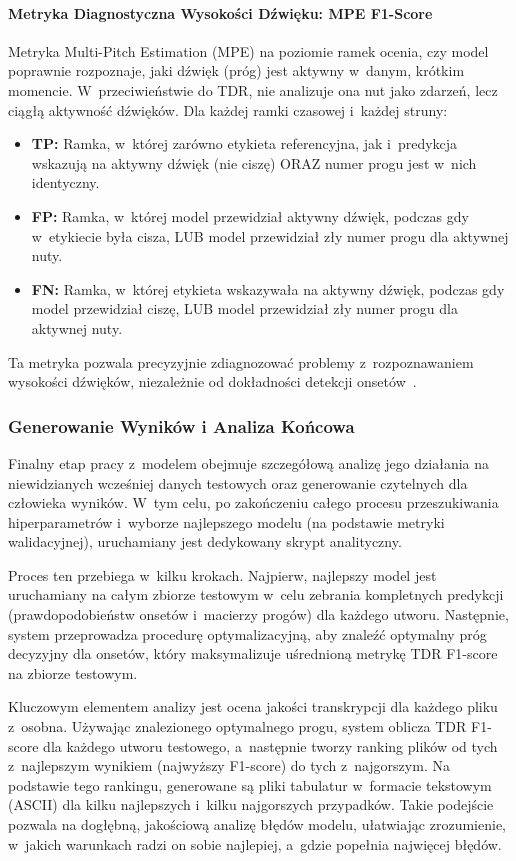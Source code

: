 \paragraph{Metryka Diagnostyczna Wysokości Dźwięku: MPE F1-Score}
Metryka Multi-Pitch Estimation (MPE) na poziomie ramek ocenia, czy model poprawnie rozpoznaje, jaki dźwięk (próg) jest aktywny w~danym, krótkim momencie. W~przeciwieństwie do TDR, nie analizuje ona nut jako zdarzeń, lecz ciągłą aktywność dźwięków. Dla każdej ramki czasowej i~każdej struny:
\begin{itemize}
    \item \textbf{TP:} Ramka, w~której zarówno etykieta referencyjna, jak i~predykcja wskazują na aktywny dźwięk (nie ciszę) ORAZ numer progu jest w~nich identyczny.
    \item \textbf{FP:} Ramka, w~której model przewidział aktywny dźwięk, podczas gdy w~etykiecie była cisza, LUB model przewidział zły numer progu dla aktywnej nuty.
    \item \textbf{FN:} Ramka, w~której etykieta wskazywała na aktywny dźwięk, podczas gdy model przewidział ciszę, LUB model przewidział zły numer progu dla aktywnej nuty.
\end{itemize}
Ta metryka pozwala precyzyjnie zdiagnozować problemy z~rozpoznawaniem wysokości dźwięków, niezależnie od dokładności detekcji onsetów~\autocite{Bittner2022BasicPitch}.

\subsubsection{Generowanie Wyników i Analiza Końcowa}
\label{sssec:generowanie_wynikow_analiza_koncowa}

Finalny etap pracy z~modelem obejmuje szczegółową analizę jego działania na niewidzianych wcześniej danych testowych oraz generowanie czytelnych dla człowieka wyników. W~tym celu, po zakończeniu całego procesu przeszukiwania hiperparametrów i~wyborze najlepszego modelu (na podstawie metryki walidacyjnej), uruchamiany jest dedykowany skrypt analityczny.

Proces ten przebiega w~kilku krokach. Najpierw, najlepszy model jest uruchamiany na całym zbiorze testowym w~celu zebrania kompletnych predykcji (prawdopodobieństw onsetów i~macierzy progów) dla każdego utworu. Następnie, system przeprowadza procedurę optymalizacyjną, aby znaleźć optymalny próg decyzyjny dla onsetów, który maksymalizuje uśrednioną metrykę TDR F1-score na zbiorze testowym.

Kluczowym elementem analizy jest ocena jakości transkrypcji dla każdego pliku z~osobna. Używając znalezionego optymalnego progu, system oblicza TDR F1-score dla każdego utworu testowego, a~następnie tworzy ranking plików od tych z~najlepszym wynikiem (najwyższy F1-score) do tych z~najgorszym. Na podstawie tego rankingu, generowane są pliki tabulatur w~formacie tekstowym (ASCII) dla kilku najlepszych i~kilku najgorszych przypadków. Takie podejście pozwala na dogłębną, jakościową analizę błędów modelu, ułatwiając zrozumienie, w~jakich warunkach radzi on sobie najlepiej, a~gdzie popełnia najwięcej błędów.

